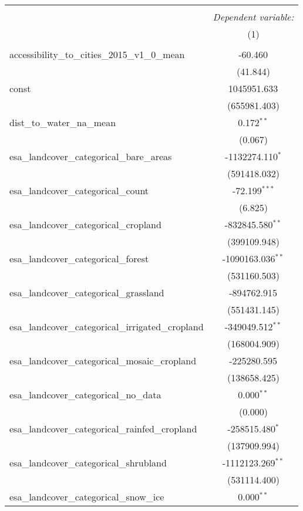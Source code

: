 \begin{table}[!htbp] \centering
\begin{tabular}{@{\extracolsep{5pt}}lc}
\\[-1.8ex]\hline
\hline \\[-1.8ex]
& \multicolumn{1}{c}{\textit{Dependent variable:}} \
\cr \cline{1-2}
\\[-1.8ex] & (1) \\
\hline \\[-1.8ex]
 accessibility_to_cities_2015_v1_0_mean & -60.460$^{}$ \\
  & (41.844) \\
 const & 1045951.633$^{}$ \\
  & (655981.403) \\
 dist_to_water_na_mean & 0.172$^{**}$ \\
  & (0.067) \\
 esa_landcover_categorical_bare_areas & -1132274.110$^{*}$ \\
  & (591418.032) \\
 esa_landcover_categorical_count & -72.199$^{***}$ \\
  & (6.825) \\
 esa_landcover_categorical_cropland & -832845.580$^{**}$ \\
  & (399109.948) \\
 esa_landcover_categorical_forest & -1090163.036$^{**}$ \\
  & (531160.503) \\
 esa_landcover_categorical_grassland & -894762.915$^{}$ \\
  & (551431.145) \\
 esa_landcover_categorical_irrigated_cropland & -349049.512$^{**}$ \\
  & (168004.909) \\
 esa_landcover_categorical_mosaic_cropland & -225280.595$^{}$ \\
  & (138658.425) \\
 esa_landcover_categorical_no_data & 0.000$^{**}$ \\
  & (0.000) \\
 esa_landcover_categorical_rainfed_cropland & -258515.480$^{*}$ \\
  & (137909.994) \\
 esa_landcover_categorical_shrubland & -1112123.269$^{**}$ \\
  & (531114.400) \\
 esa_landcover_categorical_snow_ice & 0.000$^{**}$ \\

\end{tabular}
\end{table}
